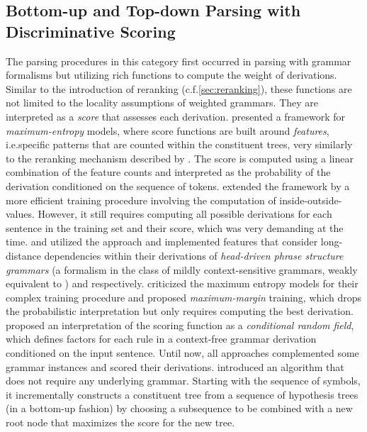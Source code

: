 \documentclass[../document.tex]{subfiles}
\begin{document}
    \subsection{Bottom-up and Top-down Parsing with Discriminative Scoring}\label{sec:literature:chart}
    The parsing procedures in this category first occurred in parsing with grammar formalisms but utilizing rich functions to compute the weight of derivations.
    Similar to the introduction of reranking (c.f.\@ \cref{sec:reranking}), these functions are not limited to the locality assumptions of weighted grammars. They are interpreted as a \emph{score} that assesses each derivation.
     presented a framework for \emph{maximum-entropy} models, where score functions are built around \emph{features}, i.e.\@ specific patterns that are counted within the constituent trees, very similarly to the reranking mechanism described by \citet{collins2001convolution}.
    The score is computed using a linear combination of the feature counts and interpreted as the probability of the derivation conditioned on the sequence of tokens.
     extended the framework by a more efficient training procedure involving the computation of inside-outside-values.
    However, it still requires computing all possible derivations for each sentence in the training set and their score, which was very demanding at the time.
     and \citet{Clark04a} utilized the approach and implemented features that consider long-distance dependencies within their derivations of \emph{head-driven phrase structure grammars} (a formalism in the class of mildly context-sensitive grammars, weakly equivalent to ) and  respectively.
     criticized the maximum entropy models for their complex training procedure and proposed \emph{maximum-margin} training, which drops the probabilistic interpretation but only requires computing the best derivation.
     proposed an interpretation of the scoring function as a \emph{conditional random field}, which defines factors for each rule in a context-free grammar derivation conditioned on the input sentence.
    Until now, all approaches complemented some grammar instances and scored their derivations.
     introduced an algorithm that does not require any underlying grammar.
    Starting with the sequence of  symbols, it incrementally constructs a constituent tree from a sequence of hypothesis trees (in a bottom-up fashion) by choosing a subsequence to be combined with a new root node that maximizes the score for the new tree.
\end{document}
